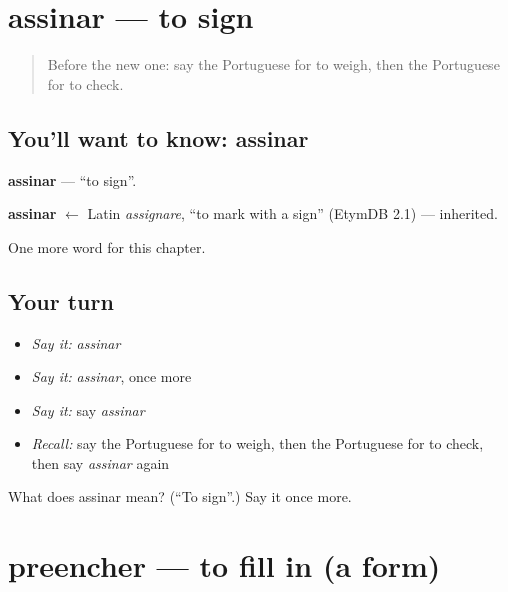 \section[assinar]{assinar — to sign}

\label{lesson:PT-C232-assinar}



\begin{quote}
Before the new one: say the Portuguese for to weigh, then the Portuguese for to check.
\end{quote}

\subsection*{You'll want to know: assinar}
\textbf{assinar} — \textquotedblleft{}to sign\textquotedblright{}.

\begin{cousinweb}
\textbf{assinar} $\leftarrow$ Latin \emph{assignare}, \textquotedblleft{}to mark with a sign\textquotedblright{} (EtymDB 2.1) — inherited.
\end{cousinweb}

\begin{grammarlens}[title={What you've built}]
One more word for this chapter.
\end{grammarlens}

\subsection*{Your turn}
\begin{itemize}
\raggedright
  \item \emph{Say it:} \emph{assinar}
  \item \emph{Say it:} \emph{assinar}, once more
  \item \emph{Say it:} say \emph{assinar}
  \item \emph{Recall:} say the Portuguese for to weigh, then the Portuguese for to check, then say \emph{assinar} again
\end{itemize}

\begin{tcolorbox}[breakable,colback=teal!4,colframe=teal!35!black,title={Before you move on}]
What does assinar mean? (\textquotedblleft{}To sign\textquotedblright{}.) Say it once more.
\end{tcolorbox}
\section[preencher]{preencher — to fill in (a form)}


